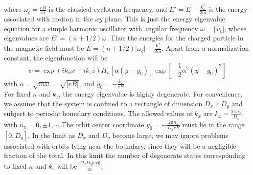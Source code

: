 where $\omega_c = \frac{eB}{m}$ is the classical cyclotron frequency, and $E'=E-\frac{k_z^2}{2m}$ is the energy associated with motion in the $xy$ plane. This is just the energy eigenvalue equation for a simple harmonic oscillator with angular frequency $\omega = |\omega_c|$, whose eigenvalues are $E' = (n+1/2)\omega$. Thus the energies for the charged particle in the magnetic field must be $E = (n+1/2)|\omega_c|+\frac{k_z^2}{2m}$. Apart from a normalization constant, the eigenfunction will be
\[\psi = \exp(ik_xx+ik_zz) H_n[\alpha(y-y_0)]\exp[-\frac{1}{2}\alpha^2 (y-y_0)^2]\]
with $\alpha = \sqrt{m\omega} = \sqrt{|eB|}$, and $y_0 = - \frac{k_x}{eB}$.\\
For fixed $n$ and $k_z$, the energy eigenvalue is highly degenerate. For convenience, we assume that the system is confined to a rectangle of dimension $D_x\times D_y$ and subject to periodic boundary conditions. The allowed
values of $k_x$ are $k_x = \frac{2\pi n_x}{D_x}$, with $n_x = 0,\pm1,\cdots$.The orbit center coordinate $y_0 = -\frac{2\pi n_x}{D_xeB}$ must lie in the range $[0,D_y]$. In the limit as $D_x$ and $D_y$ become large, we may ignore problems associated with orbits lying near the boundary, since they will be a negligible fraction of the total. In this limit the number of degenerate states corresponding to fixed $n$ and $k_z$ will be $\frac{D_xD_y |eB|}{2\pi}$.

